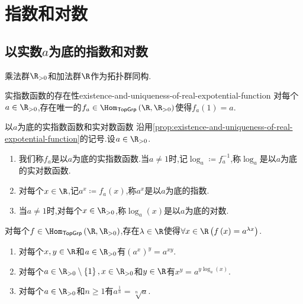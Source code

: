 \chapter{指数和对数}

\section{以实数\texorpdfstring{$a$}{a}为底的指数和对数}

\begin{theorem}{}{}
	乘法群$\R_{>0}$和加法群$\R$作为拓扑群同构.
\end{theorem}

\begin{proposition}{实指数函数的存在性}{existence-and-uniqueness-of-real-expotential-function}
	对每个$a\in\R_{>0}$,存在唯一的$f_{a}\in\Hom_{\mathsf{TopGrp}}\left(\R,\R_{>0}\right)$使得$f_{a}\left(1\right)=a$.
\end{proposition}

\begin{definition}{以$a$为底的实指数函数和实对数函数}{}
	沿用\cref{prop:existence-and-uniqueness-of-real-expotential-function}的记号.设$a\in\R_{>0}$.
	\begin{enumerate}
		\item 我们称$f_{a}$是以$a$为底的实指数函数.当$a\neq 1$时,记$\log_{a}\coloneq f_{a}^{-1}$,称$\log_{a}$是以$a$为底的实对数函数.
		\item 对每个$x\in\R$,记$a^{x}\coloneq f_{a}\left(x\right)$,称$a^{x}$是以$a$为底的指数.
		\item 当$a\neq 1$时,对每个$x\in\R_{>0}$,称$\log_{a}\left(x\right)$是以$a$为底的对数.
	\end{enumerate}
\end{definition}

\begin{proposition}{}{}
	对每个$f\in\Hom_{\mathsf{TopGrp}}\left(\R,\R_{>0}\right)$,存在$\lambda\in\R$使得$\forall x\in\R\left(f\left(x\right)=a^{\lambda x}\right)$.
\end{proposition}

\begin{corollary}{}{}
	\begin{enumerate}
		\item 对每个$x,y\in\R$和$a\in\R_{>0}$有$\left(a^{x}\right)^{y}=a^{xy}$.
		\item 对每个$a\in\R_{>0}\setminus\left\{1\right\},x\in\R_{>0}$和$y\in\R$有$x^{y}=a^{y\log_{a}\left(x\right)}$.
		\item 对每个$a\in\R_{>0}$和$n\geq 1$有$a^{\frac{1}{n}}=\sqrt[n]{a}$.
	\end{enumerate}
\end{corollary}

